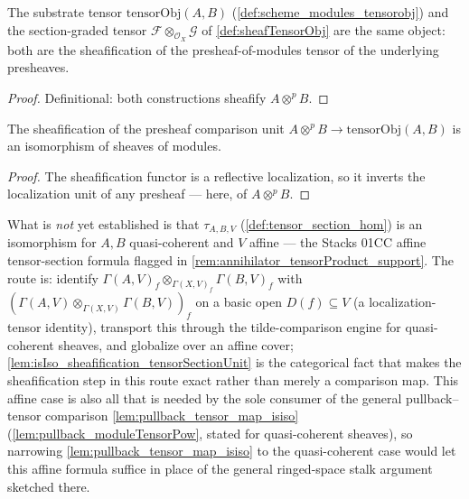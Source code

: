 \begin{lemma}\leanok
  \label{lem:tensorObj_iso_sheafTensorObj}
  The substrate tensor \(\mathrm{tensorObj}(A,B)\)
  (\cref{def:scheme_modules_tensorobj}) and the section-graded tensor
  \(\mathcal F \otimes_{\mathcal O_X} \mathcal G\) of \cref{def:sheafTensorObj}
  are the same object: both are the sheafification of the presheaf-of-modules
  tensor of the underlying presheaves.
\end{lemma}
\begin{proof}\leanok
  Definitional: both constructions sheafify \(A \otimes^p B\).
\end{proof}

\begin{lemma}\leanok
  \label{lem:isIso_sheafification_tensorSectionUnit}
  The sheafification of the presheaf comparison unit
  \(A \otimes^p B \to \mathrm{tensorObj}(A,B)\) is an isomorphism of sheaves
  of modules.
\end{lemma}
\begin{proof}\leanok
  The sheafification functor is a reflective localization, so it inverts the
  localization unit of any presheaf --- here, of \(A \otimes^p B\).
\end{proof}

\begin{remark}
  \label{rem:tensor_section_formula_gap}
  What is \emph{not} yet established is that \(\tau_{A,B,V}\)
  (\cref{def:tensor_section_hom}) is an isomorphism for \(A, B\)
  quasi-coherent and \(V\) affine --- the Stacks 01CC affine tensor-section
  formula flagged in \cref{rem:annihilator_tensorProduct_support}. The route
  is: identify \(\Gamma(A,V)_f \otimes_{\Gamma(X,V)_f} \Gamma(B,V)_f\) with
  \((\Gamma(A,V) \otimes_{\Gamma(X,V)} \Gamma(B,V))_f\) on a basic open
  \(D(f) \subseteq V\) (a localization-tensor identity), transport this
  through the tilde-comparison engine for quasi-coherent sheaves, and
  globalize over an affine cover; \cref{lem:isIso_sheafification_tensorSectionUnit}
  is the categorical fact that makes the sheafification step in this route
  exact rather than merely a comparison map. This affine case is also all
  that is needed by the sole consumer of the general pullback--tensor
  comparison \cref{lem:pullback_tensor_map_isiso}
  (\cref{lem:pullback_moduleTensorPow}, stated for quasi-coherent sheaves),
  so narrowing \cref{lem:pullback_tensor_map_isiso} to the quasi-coherent
  case would let this affine formula suffice in place of the general
  ringed-space stalk argument sketched there.
\end{remark}

